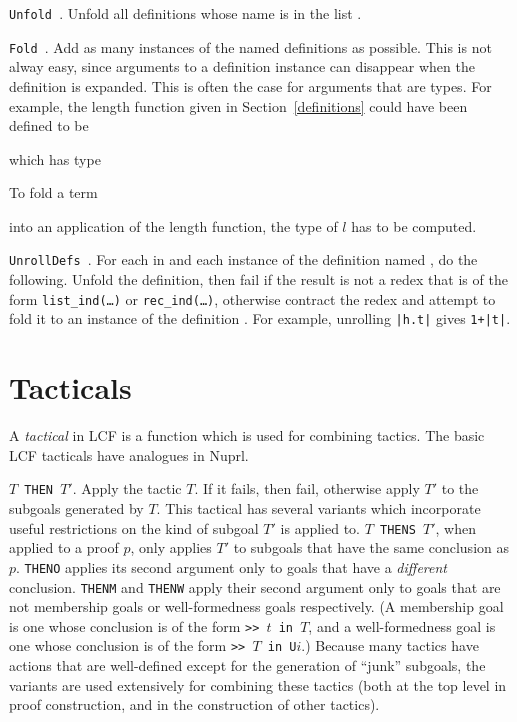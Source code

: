 {\tt Unfold }.  Unfold all definitions whose name is in the list
.

{\tt Fold }.  Add as many instances of the named definitions as
possible.  This is not alway easy, since arguments to a definition instance
can disappear when the definition is expanded.  This is often the case for
arguments that are types.   For example, the length function given in
Section~\ref{definitions} could have been defined to be 
\begin{Numath}
\end{Numath}%
which has type
\begin{Numath}
\end{Numath}%
To fold a term 
\begin{Numath}
\end{Numath}%
into an application of the length function, the type of $l$ has to be computed.

{\tt UnrollDefs }.  For each  in  and each
instance of the definition named , do the following.  Unfold the
definition, then fail if the result is not a redex that
is of the form {\tt list\_ind(\ldots)} or {\tt rec\_ind(\ldots)}, otherwise
contract the redex and attempt to fold it to an instance of the definition
.  For
example, unrolling {\tt |h.t|} gives {\tt 1+|t|}.

\section{Tacticals}

A {\em tactical} in LCF is a function which is used for combining tactics.  The
basic LCF tacticals have analogues in Nuprl.  

{\tt $T$ THEN $T'$}.  Apply the tactic $T$.  If it fails, then fail, otherwise apply
$T'$ to the subgoals generated by $T$.  This tactical has several variants
which incorporate useful restrictions on the kind of subgoal $T'$ is applied
to.  {\tt $T$~THENS~$T'$}, when applied to a proof $p$, only applies $T'$ to
subgoals that have the same conclusion as $p$.  {\tt THENO} applies its second
argument only to goals that have a {\em different} conclusion.  {\tt THENM} and
{\tt THENW} apply their second argument only to goals that are not membership
goals or well-formedness goals respectively.  (A membership goal is one
whose conclusion is of the form {\tt >>~$t$~in~$T$}, and a well-formedness goal
is one whose conclusion is of the form {\tt >>~$T$~in~U$i$}.)  Because many
tactics have actions that are well-defined except for the generation of
``junk'' subgoals, the variants are used extensively for combining these tactics
(both at the top level in proof construction, and in the construction of other
tactics).

